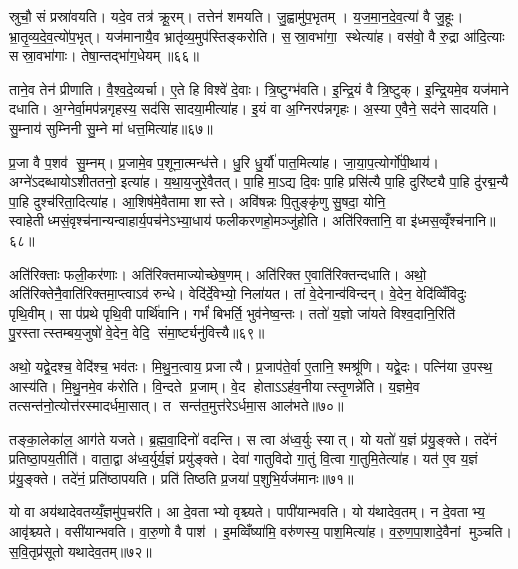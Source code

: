 स्रुचौ॒ सं प्रस्रा॑वयति। यदे॒व तत्र॑ क्रू॒रम्। तत्तेन॑ शमयति। जु॒ह्वामु॑प॒भृतम्। य॒ज॒मा॒न॒दे॒व॒त्या॑ वै जु॒हूः। भ्रा॒तृ॒व्य॒दे॒व॒त्यो॑प॒भृत्। यज॑मानायै॒व भ्रातृ॑व्य॒मुप॑स्तिङ्करोति। स॒स्रा॒वभा॑गा॒ स्थेत्या॑ह। वस॑वो॒ वै रु॒द्रा आ॑दि॒त्याः सस्रा॒वभा॑गाः। तेषा॒न्तद्भा॑ग॒धेयम्॥६६॥

ताने॒व तेन॑ प्रीणाति। वै॒श्व॒दे॒व्यर्चा। ए॒ते हि विश्वे॑ दे॒वाः। त्रि॒ष्टुग्भ॑वति। इ॒न्द्रि॒यं वै त्रि॒ष्टुक्। इ॒न्द्रि॒यमे॒व यज॑माने दधाति। अ॒ग्नेर्वा॒मप॑न्नगृहस्य॒ सद॑सि सादया॒मीत्या॑ह। इ॒यं वा अ॒ग्निरप॑न्नगृहः। अ॒स्या ए॒वैने॒ सद॑ने सादयति। सु॒म्नाय॑ सुम्निनी सु॒म्ने मा॑ धत्त॒मित्या॑ह॥६७॥

प्र॒जा वै प॒शव॑ सु॒म्नम्। प्र॒जामे॒व प॒शूना॒त्मन्ध॑त्ते। धु॒रि धु॒र्यौ॑ पात॒मित्या॑ह। जा॒या॒प॒त्योर्गो॑पी॒थाय॑। अग्ने॑ऽदब्धायोऽशीततनो॒ इत्या॑ह। य॒था॒य॒जुरे॒वैतत्। पा॒हि मा॒ऽद्य दि॒वः पा॒हि प्रसि॑त्यै पा॒हि दुरि॑ष्ट्यै पा॒हि दु॑रद्म॒न्यै पा॒हि दुश्च॑रिता॒दित्या॑ह। आ॒शिष॑मे॒वैतामा शास्ते। अवि॑षन्नः पि॒तुङ्कृ॑णु सु॒षदा॒ योनि॒ स्वाहेतीध्मसं॒वृश्च॑नान्यन्वाहार्य॒पच॑नेऽभ्या॒धाय॑ फलीकरणहो॒मञ्जु॑होति। अति॑रिक्तानि॒ वा इ॑ध्मस॒व्वृँश्च॑नानि॥६८॥

अति॑रिक्ताः फली॒कर॑णाः। अति॑रिक्तमाज्योच्छेष॒णम्। अति॑रिक्त ए॒वाति॑रिक्तन्दधाति। अथो॒ अति॑रिक्तेनै॒वाति॑रिक्तमा॒प्त्वाऽव॑ रुन्धे। वेदि॑र्दे॒वेभ्यो॒ निला॑यत। तां वे॒देनान्व॑विन्दन्। वे॒देन॒ वेदि॑व्विँविदुः पृथि॒वीम्। सा प॑प्रथे पृथि॒वी पार्थि॑वानि। गर्भं॑ बिभर्ति॒ भुव॑नेष्व॒न्तः। ततो॑ य॒ज्ञो जा॑यते विश्व॒दानि॒रिति॑ पु॒रस्तात्स्तम्बय॒जुषो॑ वे॒देन॒ वेदि॒ संमा॒र्ष्ट्यनु॑वित्त्यै॥६९॥

अथो॒ यद्वे॒दश्च॒ वेदि॑श्च॒ भव॑तः। मि॒थु॒न॒त्वाय॒ प्रजात्यै। प्र॒जाप॑ते॒र्वा ए॒तानि॒ श्मश्रू॑णि। यद्वे॒दः। पत्नि॑या उ॒पस्थ॒ आस्य॑ति। मि॒थु॒नमे॒व क॑रोति। वि॒न्दते प्र॒जाम्। वे॒द होताऽऽह॑व॒नीयात्स्तृ॒णन्ने॑ति। य॒ज्ञमे॒व तत्सन्त॑नो॒त्योत्त॑रस्मादर्धमा॒सात्। त सन्त॑त॒मुत्त॑रेऽर्धमा॒स आल॑भते॥७०॥

तङ्का॒लेका॑ल॒ आग॑ते यजते। ब्र॒ह्म॒वा॒दिनो॑ वदन्ति। स त्वा अ॑ध्व॒र्युः स्यात्। यो यतो॑ य॒ज्ञं प्र॑यु॒ङ्क्ते। तदे॑नं प्रतिष्ठा॒पय॒तीति॑। वाता॒द्वा अ॑ध्व॒र्युर्य॒ज्ञं प्रयु॑ङ्क्ते। देवा॑ गातुविदो गा॒तुं वि॒त्वा गा॒तुमि॒तेत्या॑ह। यत॑ ए॒व य॒ज्ञं प्र॑यु॒ङ्क्ते। तदे॑नं॒ प्रति॑ष्ठापयति। प्रति॑ तिष्ठति प्र॒जया॑ प॒शुभि॒र्यज॑मानः॥७१॥

यो वा अय॑थादेवतय्यँ॒ज्ञमु॑प॒चर॑ति। आ दे॒वताभ्यो वृश्च्यते। पापी॑यान्भवति। यो य॑थादेव॒तम्। न दे॒वताभ्य॒ आवृ॑श्च्यते। वसी॑यान्भवति। वा॒रु॒णो वै पाश॑। इ॒मव्विँष्या॑मि॒ वरु॑णस्य॒ पाश॒मित्या॑ह। व॒रु॒ण॒पा॒शादे॒वैनां मुञ्चति। स॒वि॒तृप्र॑सूतो यथादेव॒तम्॥७२॥

